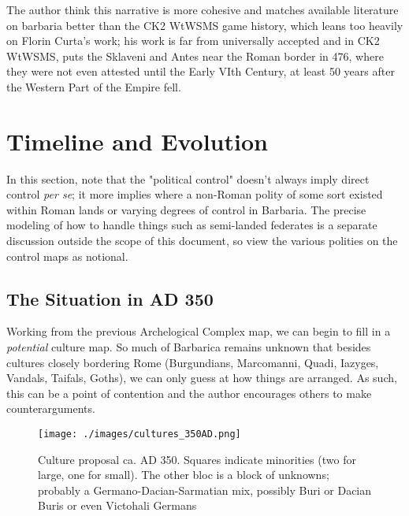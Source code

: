 \documentclass{article}
\begin{document}
	The author think this narrative is more cohesive and matches available literature on barbaria better than the CK2 WtWSMS game history, which leans too heavily on Florin Curta’s work; his work is far from universally accepted and in CK2 WtWSMS, puts the Sklaveni and Antes near the Roman border in 476, where they were not even attested until the Early VIth Century, at least 50 years after the Western Part of the Empire fell. 
	
	\section{Timeline and Evolution}
	\label{sec:timeline}
	
	In this section, note that the "political control" doesn't always imply direct control \textit{per se}; it more implies where a non-Roman polity of some sort existed within Roman lands or varying degrees of control in Barbaria.
	The precise modeling of how to handle things such as semi-landed federates is a separate discussion outside the scope of this document, so view the various polities on the control maps as notional.
	
	\subsection{The Situation in AD 350}
	\label{sec:timeline:subsec:350}
	
	Working from the previous Archelogical Complex map, we can begin to fill in a \textit{potential} culture map.
	So much of Barbarica remains unknown that besides cultures closely bordering Rome (Burgundians, Marcomanni, Quadi, Iazyges, Vandals, Taifals, Goths), we can only guess at how things are arranged.
	As such, this can be a point of contention and the author encourages others to make counterarguments.
	
	\begin{figure}[h!]
		\centering
		\texttt{[image: ./images/cultures\_350AD.png]}
		\caption{Culture proposal ca. AD 350. Squares indicate minorities (two for large, one for small).
			\newline\tiny The other bloc is a block of unknowns; probably a Germano-Dacian-Sarmatian mix, possibly Buri or Dacian Buris or even Victohali Germans}
	\end{figure}
	
\end{document}
